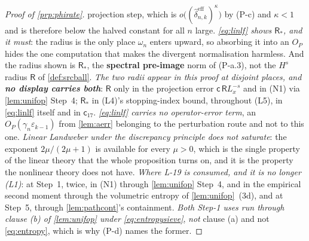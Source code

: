\begin{proof}[Proof of \cref{prp:phirate}]
projection step, which is $o\big((\hat\delta^{\mathrm{eff}}_{n,k})^{\kappa}\big)$ by (P-c) and $\kappa<1$
and is therefore below the halved constant for all $n$ large.
\emph{\eqref{eq:linlf} shows $\mathsf R_\ast$, and it must}: the radius is the
only place $\omega_n$ enters upward, so absorbing it into an $O_P$ hides the one computation that makes
the divergent normalisation harmless. And the radius shown is $\mathsf R_\ast$, the \textbf{spectral
pre-image} norm of (P-a.3), not the $H^{s}$ radius $\mathsf R$ of \cref{def:srcball}. \emph{The two radii
appear in this proof at disjoint places, and \textbf{no display carries both}}: $\mathsf R$ only in the
projection error $\mathsf c\,\mathsf RL_x^{-s}$ and in (N1) via \cref{lem:unifop} Step~4; $\mathsf R_\ast$
in (L4)'s stopping-index bound, throughout (L5), in \eqref{eq:linlf} itself and in $\mathsf c_{17}$.
\emph{\eqref{eq:linlf} carries no operator-error
term}, an $O_P(\gamma_n\varepsilon_{k-1})$ from \cref{lem:aerr} belonging to the
perturbation route and not to this one.
\emph{Linear Landweber under the discrepancy principle does not saturate}: the exponent
$2\mu/(2\mu+1)$ is available for every $\mu>0$, which is the single property of the linear theory that
the whole proposition turns on, and it is the property the nonlinear theory does not have. \emph{Where
L-19 is consumed, and it is no longer (L1)}: at Step~1, twice, in (N1) through \cref{lem:unifop}
Step~4, and in the empirical second moment through the volumetric entropy of \cref{lem:unifop}~(3d), 
and at Step~5, through \cref{lem:pathcont}'s containment. \emph{Both Step-1 uses run through clause (b)
of \cref{lem:unifop} under \eqref{eq:entropysieve}}, \emph{not} clause (a) and not \eqref{eq:entropy},
which is why (P-d) names the former.


\end{proof}
